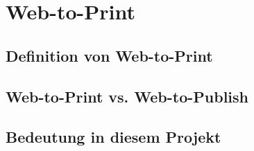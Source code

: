 \chapter{Web-to-Print} \label{web2print}

\section{Definition von Web-to-Print}

\section{Web-to-Print vs. Web-to-Publish}

\section{Bedeutung in diesem Projekt}